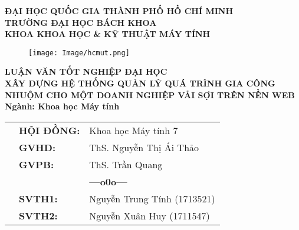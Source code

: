 \documentclass[a4paper,12pt,fleqn,print,oneside]{extarticle}
\begin{document}
\begin{titlepage}


\afterpage{\aftergroup\restoregeometry}
\begin{center}
\textbf{{\Large ĐẠI HỌC QUỐC GIA THÀNH PHỐ HỒ CHÍ MINH \\
TRƯỜNG ĐẠI HỌC BÁCH KHOA \\
KHOA KHOA HỌC \& KỸ THUẬT MÁY TÍNH}}
\end{center}

\vspace{0.5cm}

\begin{figure}[h!]
\begin{center}
\texttt{[image: Image/hcmut.png]}
\end{center}
\end{figure}

\vspace{0.5cm}


\begin{center}
\textbf{{\Large LUẬN VĂN TỐT NGHIỆP ĐẠI HỌC}}\\
\vspace{1cm}
\textbf{{\Large XÂY DỰNG HỆ THỐNG QUẢN LÝ QUÁ TRÌNH GIA CÔNG NHUỘM CHO MỘT DOANH NGHIỆP VẢI SỢI TRÊN NỀN WEB}}\\
\vspace{1cm}
\textbf{{\Large Ngành: Khoa học Máy tính}}
\end{center}

\vspace{1.8cm}

\begin{table}[h]
\renewcommand{\arraystretch}{1.5}
\begin{tabular}{lll}
\hspace{5 cm}
& \textbf{{\large HỘI ĐỒNG:}} & {\large Khoa học Máy tính 7} \\
& \textbf{{\large GVHD:}} & {\large ThS. Nguyễn Thị Ái Thảo} \\
& \textbf{{\large GVPB:}} & {\large ThS. Trần Quang}\\
&  & \textbf{---o0o---} \\
& \textbf{{\large SVTH1:}} & {\large Nguyễn Trung Tính (1713521)} \\
& \textbf{{\large SVTH2:}} & {\large Nguyễn Xuân Huy (1711547)} \\
\end{tabular}
\end{table}


\end{titlepage}
\end{document}
